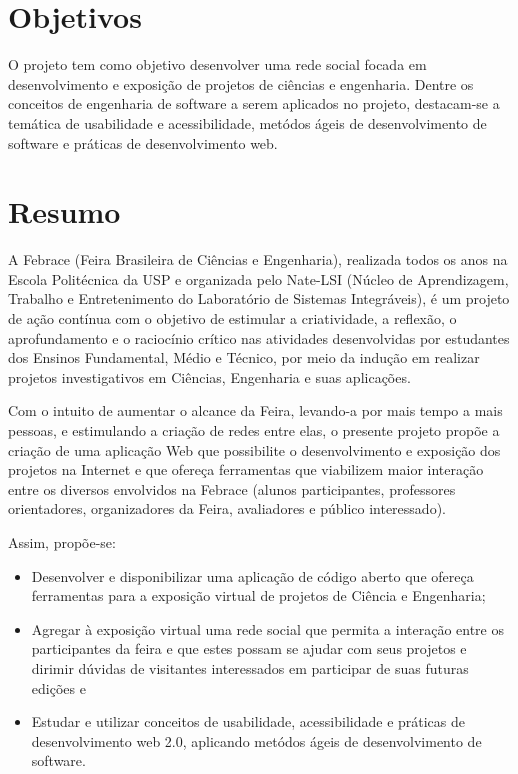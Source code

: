 \documentclass[a4paper,12pt,font=plain,header=plain]{abnt}
\begin{document}
  \section{Objetivos}
    O projeto tem como objetivo desenvolver uma rede social focada em desenvolvimento e exposição de projetos de ciências e engenharia. Dentre os conceitos de engenharia de software a serem aplicados no projeto, destacam-se a temática de usabilidade e acessibilidade, metódos ágeis de desenvolvimento de software e práticas de desenvolvimento web.

  \section{Resumo}

    A Febrace (Feira Brasileira de Ciências e Engenharia), realizada todos os anos na Escola Politécnica da USP e organizada pelo Nate-LSI (Núcleo de Aprendizagem, Trabalho e Entretenimento do Laboratório de Sistemas Integráveis), é um projeto de ação contínua com o objetivo de estimular a criatividade, a reflexão, o aprofundamento e o raciocínio crítico nas atividades desenvolvidas por estudantes dos Ensinos Fundamental, Médio e Técnico, por meio da indução em realizar projetos investigativos em Ciências, Engenharia e suas aplicações.

    Com o intuito de aumentar o alcance da Feira, levando-a por mais tempo a mais pessoas, e estimulando a criação de redes entre elas, o presente projeto propõe a criação de uma aplicação Web que possibilite o desenvolvimento e exposição dos projetos na Internet e que ofereça ferramentas que viabilizem maior interação entre os diversos envolvidos na Febrace (alunos participantes, professores orientadores, organizadores da Feira, avaliadores e público interessado).

    Assim, propõe-se:

    \begin{itemize}
      \item{
        Desenvolver e disponibilizar uma aplicação de código aberto que ofereça ferramentas para a exposição virtual de projetos de Ciência e Engenharia;
      }
      \item{
        Agregar à exposição virtual uma rede social que permita a interação entre os participantes da feira e que estes possam se ajudar com seus projetos e dirimir dúvidas de visitantes interessados em participar de suas futuras edições e
      }
      \item{
        Estudar e utilizar conceitos de usabilidade, acessibilidade e práticas de desenvolvimento web 2.0, aplicando metódos ágeis de desenvolvimento de software.
      }
    \end{itemize}
\end{document}
